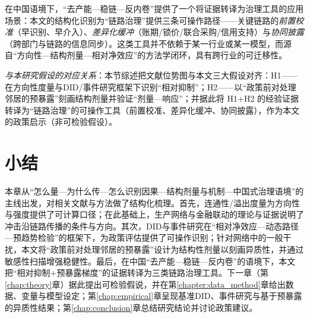 在中国语境下，“去产能—稳链—反内卷”提供了一个将证据转译为治理工具的应用场景：本文的结构化识别为“链路治理”提供三条可操作路径——关键链路的\emph{前置校准}（早识别、早介入）、\emph{差异化缓冲}（账期/锁价/联合采购/信用支持）与\emph{协同披露}（跨部门与链路的信息同步）。这类工具并不依赖于某一行业或某一模型，而源自“方向性—结构剂量—相对净效应”的方法学闭环，具有跨行业的可迁移性。

\noindent\textit{与本研究假设的对应关系}：本节综述把文献位势图与本文三大假设对齐：H1——在方向性度量与DID/事件研究框架下识别“相对抑制”；H2——以“政策前对处理邻居的预暴露”刻画结构剂量并验证“剂量—响应”；并据此将 H1+H2 的经验证据转译为“链路治理”的可操作工具（前置校准、差异化缓冲、协同披露），作为本文的政策启示（非可检验假设）。
\section{小结}
本章从“怎么量—为什么传—怎么识别因果—结构剂量与机制—中国式治理语境”的主线出发，对相关文献与方法做了结构化梳理。首先，连通性/溢出度量为方向性与强度提供了可计算口径；在此基础上，生产网络与金融联动的理论与证据说明了冲击沿链路传播的条件与方向。其次，DID与事件研究在“相对净效应—动态路径—预趋势检验”的框架下，为政策评估提供了可操作识别；针对网络中的一般干扰，本文将“政策前对处理邻居的预暴露”设计为结构性剂量以刻画异质性，并通过敏感性扫描增强稳健性。最后，在中国“去产能—稳链—反内卷”的语境下，本文把“相对抑制+预暴露梯度”的证据转译为三类链路治理工具。下一章（第\ref{chap:theory}章）据此提出可检验假说，并在第\ref{chapter:data_method}章给出数据、变量与模型设定；第\ref{chap:empirical}章呈现基准DID、事件研究与基于预暴露的异质性结果；第\ref{chap:conclusion}章总结研究结论并讨论政策建议。